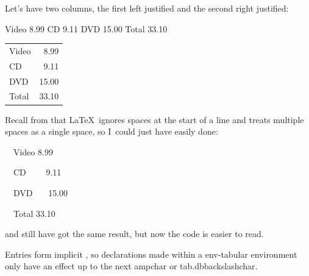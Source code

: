 
Let's have two columns, the first left justified and the second right justified:
\begin{code}
\newline
Video 
8.99\newline
CD  9.11\newline
DVD 
15.00\newline
Total  33.10\newline
{}
\end{code}

\begin{result}
\begin{tabular}{lr}
Video & 8.99\\
CD & 9.11\\
DVD & 15.00\\
Total & 33.10
\end{tabular}
\end{result}%
Recall from  that \LaTeX\ ignores spaces at the start of a line and
treats multiple spaces as a single space, so I~could just have
easily done:
\begin{code}
\newline
\strut~~Video  8.99\newline
\strut~~CD~~~~ 9.11\newline
\strut~~DVD~~~ 15.00\newline
\strut~~Total  33.10\newline
{}
\end{code}%
and still have got the same result, but now the code is easier to
read.

Entries form implicit , so
\glspl{declaration} made
within a \gls{env-tabular} environment only have an effect up to the
next \gls{ampchar} or \gls{tab.dbbackslashchar}.  

